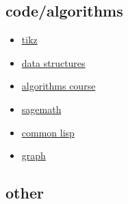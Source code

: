 \documentclass[a4paper,12pt]{article}
\begin{document}
\subsection{code/algorithms}
\label{sec:orgc137228}
\begin{itemize}
\item \href{tikz.org}{tikz}\\
\item \href{data_structures.org}{data structures}\\
\item \href{algorithms.org}{algorithms course}\\
\item \href{sage.org}{sagemath}\\
\item \href{20230224163920-common_lisp.org}{common lisp}\\
\item \href{20230314001051-graph.org}{graph}\\
\end{itemize}
\subsection{other}
\label{sec:orgda51e4c}
\end{document}
